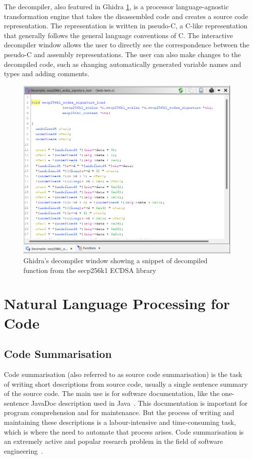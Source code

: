 The decompiler, also featured in Ghidra \ref{fig:decompiler}, is a processor language-agnostic transformation engine that takes the disassembled code and creates a source code representation. The representation is written in pseudo-C, a C-like representation that generally follows the general language conventions of C. The interactive decompiler window allows the user to directly see the correspondence between the pseudo-C and assembly representations. The user can also make changes to the decompiled code, such as changing automatically generated variable names and types and adding comments. 

\begin{figure}[H]
  \centering
  \includegraphics[width=\linewidth]{img/decompiler.png}
  \caption{Ghidra's decompiler window showing a snippet of decompiled function from the secp256k1 ECDSA library}
  \label{fig:decompiler}
\end{figure}

\newpage
\section{Natural Language Processing for Code}

\subsection{Code Summarisation}
Code summarisation (also referred to as source code summarisation) is the task of writing short descriptions from source code, usually a single sentence summary of the source code. The main use is for software documentation, like the one-sentence JavaDoc description used in Java~\cite{recommend_summarization}. This documentation is important for program comprehension and for maintenance. But the process of writing and maintaining these descriptions is a labour-intensive and time-consuming task, which is where the need to automate that process arises. Code summarisation is an extremely active and popular research problem in the field of software engineering~\cite{recommend_summarization}.

